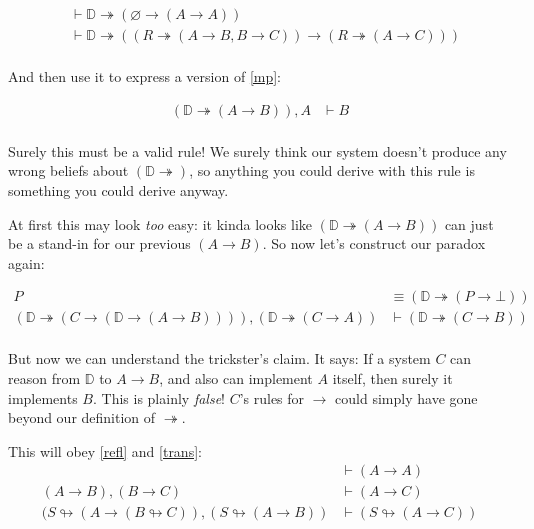 \documentclass{article}
\renewcommand{\emptyset}{\varnothing}
\begin{document}
  \begin{align*}
    &\vdash \mathbb{D} \twoheadrightarrow (\emptyset \to (A \to A)) \\
    &\vdash \mathbb{D} \twoheadrightarrow ((R \twoheadrightarrow (A \to B, B \to C)) \to (R \twoheadrightarrow (A \to C))) \\
  \end{align*}

  And then use it to express a version of \eqref{mp}:
  \newcommand{\dto}{\mathbb{D} \twoheadrightarrow}

  \begin{align*}
    \label{mp_deriv}
    \tag{modus ponens for $\twoheadrightarrow$}
    (\dto (A \to B)), A &\vdash B \\
  \end{align*}

  Surely this must be a valid rule!
  We surely think our system doesn't produce any wrong beliefs about $(\dto)$, so anything you could derive with this rule is something you could derive anyway.

  At first this may look \emph{too} easy: it kinda looks like $(\mathbb{D} \twoheadrightarrow (A \to B))$ can just be a stand-in for our previous $(A \to B)$. So now let's construct our paradox again:

  \begin{align*}
    P &\equiv (\dto (P \to \bot)) \\
    \label{unsoundrule_deriv}
    \tag{the trickster for $\twoheadrightarrow$}
    (\dto (C \to (\mathbb{D} \to (A \to B)))), (\dto (C \to A)) &\vdash (\dto (C \to B)) \\
  \end{align*}

  But now we can understand the trickster's claim.
  It says: If a system $C$ can reason from $\mathbb{D}$ to $A \to B$, and also can implement $A$ itself, then surely it implements $B$.
  This is plainly \emph{false}!
  $C$'s rules for $\to$ could simply have gone beyond our definition of $\twoheadrightarrow$.

  This will obey \eqref{refl} and \eqref{trans}:
  \begin{align*}
    \tag{reflexivity}
    &\vdash (A \to A) \\
    \label{trans}
    \tag{transitivity}
    (A \to B), (B \to C) &\vdash (A \to C) \\
    (S \looparrowright (A \to (B \looparrowright C)), (S \looparrowright (A \to B)) &\vdash (S \looparrowright (A \to C)) \\
  \end{align*}
\end{document}
